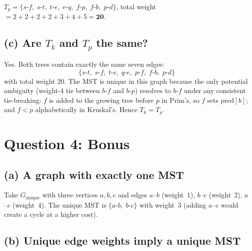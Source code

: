 \documentclass[11pt]{article}
\begin{document}
$T_p = \{s\text{-}f,\; s\text{-}t,\; t\text{-}e,\; e\text{-}q,\; f\text{-}p,\; f\text{-}b,\; p\text{-}d\}$, \quad total weight $= 2+2+2+2+3+4+5 = \mathbf{20}$.

\subsection*{(c) Are $T_k$ and $T_p$ the same?}

Yes.  Both trees contain exactly the same seven edges:
\[
\{s\text{-}t,\; s\text{-}f,\; t\text{-}e,\; q\text{-}e,\; p\text{-}f,\; f\text{-}b,\; p\text{-}d\}
\]
with total weight 20.  The MST is unique in this graph because the only potential ambiguity (weight-4 tie between $b$-$f$ and $b$-$p$) resolves to $b$-$f$ under any consistent tie-breaking: $f$ is added to the growing tree before $p$ in Prim's, so $f$ sets $\mathrm{pred}[b]$; and $f < p$ alphabetically in Kruskal's.  Hence $T_k = T_p$.

\newpage
\section*{Question 4: Bonus}

\subsection*{(a) A graph with exactly one MST}

Take $G_{\mathrm{unique}}$ with three vertices $a,b,c$ and edges $a$--$b$ (weight~1), $b$--$c$ (weight~2), $a$--$c$ (weight~4).  The unique MST is $\{a\text{-}b,\; b\text{-}c\}$ with weight~3 (adding $a$--$c$ would create a cycle at a higher cost).

\begin{center}
\end{center}

\subsection*{(b) Unique edge weights imply a unique MST}
\end{document}
